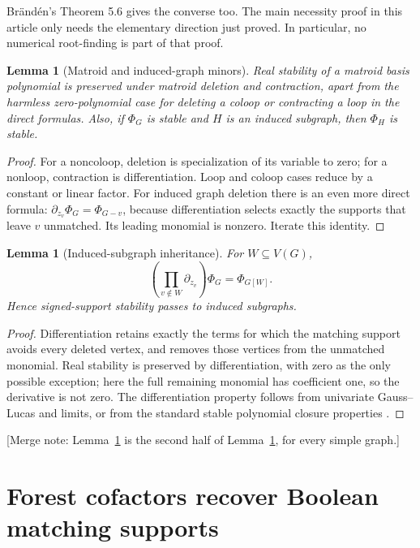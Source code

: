 \documentclass[11pt]{article}
\numberwithin{equation}{section}
\newtheorem{lemma}[theorem]{Lemma}
\theoremstyle{definition}
\begin{document}
Br\"and\'en's Theorem 5.6 \cite{Branden} gives the converse too.  The
main necessity proof in this article only needs the elementary direction
just proved.  In particular, no numerical root-finding is part of that
proof.

\begin{lemma}[Matroid and induced-graph minors]
\label{ade:lem:minors}
Real stability of a matroid basis polynomial is preserved under matroid
deletion and contraction, apart from the harmless zero-polynomial case
for deleting a coloop or contracting a loop in the direct formulas.
Also, if $\Phi_G$ is stable and $H$ is an induced subgraph, then $\Phi_H$
is stable.
\end{lemma}
\begin{proof}
For a noncoloop, deletion is specialization of its variable to zero;
for a nonloop, contraction is differentiation.  Loop and coloop cases
reduce by a constant or linear factor.  For induced graph deletion there
is an even more direct formula:
$\partial_{z_v}\Phi_G=\Phi_{G-v}$, because differentiation selects exactly
the supports that leave $v$ unmatched.  Its leading monomial is nonzero.
Iterate this identity.
\end{proof}

\begin{lemma}[Induced-subgraph inheritance]\label{ade:mat:lem:induced}
For $W\subseteq V(G)$,
\begin{equation}
 \left(\prod_{v\notin W}\partial_{z_v}\right)\Phi_G=\Phi_{G[W]}.
\label{ade:mat:eq:induced-derivative}
\end{equation}
Hence signed-support stability passes to induced subgraphs.
\end{lemma}
\begin{proof}
Differentiation retains exactly the terms for which the matching support
avoids every deleted vertex, and removes those vertices from the unmatched
monomial. Real stability is preserved by differentiation, with zero as the
only possible exception; here the full remaining monomial has coefficient
one, so the derivative is not zero. The differentiation property follows
from univariate Gauss--Lucas and limits, or from the standard stable
polynomial closure properties \cite{Branden}.
\end{proof}

[Merge note: Lemma~\ref{ade:mat:lem:induced} is the second half of
Lemma~\ref{ade:lem:minors}, for every simple graph.]

\section{Forest cofactors recover Boolean matching supports}
\label{ade:sec:cofactor}
\end{document}
